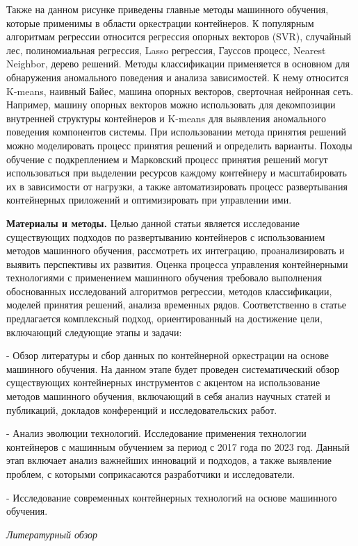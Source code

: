 Также на данном рисунке приведены главные методы машинного обучения,
которые применимы в области оркестрации контейнеров. К популярным
алгоритмам регрессии относится регрессия опорных векторов (SVR),
случайный лес, полиномиальная регрессия, Lasso регрессия, Гауссов
процесс, Nearest Neighbor, дерево решений. Методы классификации
применяется в основном для обнаружения аномального поведения и анализа
зависимостей. К нему относится K-means, наивный Байес, машина опорных
векторов, сверточная нейронная сеть. Например, машину опорных векторов
можно использовать для декомпозиции внутренней структуры контейнеров и
K-means для выявления аномального поведения компонентов системы. При
использовании метода принятия решений можно моделировать процесс
принятия решений и определить варианты. Походы обучение с подкреплением
и Марковский процесс принятия решений могут использоваться при выделении
ресурсов каждому контейнеру и масштабировать их в зависимости от
нагрузки, а также автоматизировать процесс развертывания контейнерных
приложений и оптимизировать при управлении ими.

\textbf{Материалы и методы.} Целью данной статьи является исследование
существующих подходов по развертыванию контейнеров с использованием
методов машинного обучения, рассмотреть их интеграцию, проанализировать
и выявить перспективы их развития. Оценка процесса управления
контейнерными технологиями с применением машинного обучения требовало
выполнения обоснованных исследований алгоритмов регрессии, методов
классификации, моделей принятия решений, анализа временных рядов.
Соответственно в статье предлагается комплексный подход, ориентированный
на достижение цели, включающий следующие этапы и задачи:

- Обзор литературы и сбор данных по контейнерной оркестрации на основе
машинного обучения. На данном этапе будет проведен систематический обзор
существующих контейнерных инструментов с акцентом на использование
методов машинного обучения, включающий в себя анализ научных статей и
публикаций, докладов конференций и исследовательских работ.

- Анализ эволюции технологий. Исследование применения технологии
контейнеров с машинным обучением за период с 2017 года по 2023 год.
Данный этап включает анализ важнейших инноваций и подходов, а также
выявление проблем, с которыми соприкасаются разработчики и
исследователи.

- Исследование современных контейнерных технологий на основе машинного
обучения.

\emph{Литературный обзор}

